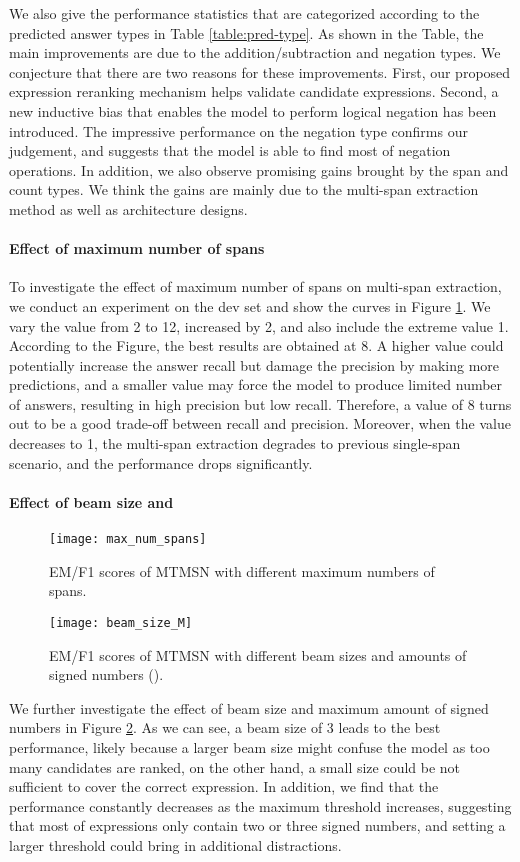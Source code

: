 \documentclass[11pt,a4paper]{article}
\newcommand\mtmsnlarge{MTMSN\xspace}
\begin{document}
We also give the performance statistics that are categorized according to the predicted answer types in Table \ref{table:pred-type}. 
As shown in the Table, the main improvements are due to the addition/subtraction and negation types.
We conjecture that there are two reasons for these improvements.
First, our proposed expression reranking mechanism helps validate candidate expressions.
Second, a new inductive bias that enables the model to perform logical negation has been introduced.
The impressive performance on the negation type confirms our judgement, and suggests that the model is able to find most of negation operations.
In addition, we also observe promising gains brought by the span and count types. 
We think the gains are mainly due to the multi-span extraction method as well as architecture designs.

\paragraph{Effect of maximum number of spans}
To investigate the effect of maximum number of spans on multi-span extraction, we conduct an experiment on the dev set and show the curves in Figure \ref{fig:max_num_spans}.
We vary the value from 2 to 12, increased by 2, and also include the extreme value 1.
According to the Figure, the best results are obtained at 8. 
A higher value could potentially increase the answer recall but damage the precision by making more predictions, and a smaller value may force the model to produce limited number of answers, resulting in high precision but low recall.
Therefore, a value of 8 turns out to be a good trade-off between recall and precision.
Moreover, when the value decreases to 1, the multi-span extraction degrades to previous single-span scenario, and the performance drops significantly.

\paragraph{Effect of beam size and }
\begin{figure}
	\center
	\texttt{[image: max\_num\_spans]}
	\caption{EM/F1 scores of \mtmsnlarge with different maximum numbers of spans.}
	\label{fig:max_num_spans}
\end{figure}

\begin{figure}
	\center
	\texttt{[image: beam\_size\_M]}
	\caption{EM/F1 scores of \mtmsnlarge with different beam sizes and amounts of signed numbers ().}
	\label{fig:beam_size_M}
\end{figure}
We further investigate the effect of beam size and maximum amount of signed numbers in Figure \ref{fig:beam_size_M}. 
As we can see, a beam size of 3 leads to the best performance, likely because a larger beam size might confuse the model as too many candidates are ranked, on the other hand, a small size could be not sufficient to cover the correct expression.
In addition, we find that the performance constantly decreases as the maximum threshold  increases, suggesting that most of expressions only contain two or three signed numbers, and setting a larger threshold could bring in additional distractions.
\end{document}
